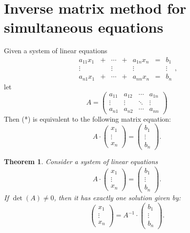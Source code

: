 \documentclass[
  12pt,
  oneside]{book}
\newtheorem{theorem}{Theorem}[chapter]
\theoremstyle{definition}
\theoremstyle{definition}
\theoremstyle{definition}
\theoremstyle{definition}
\theoremstyle{remark}
\begin{document}
\hypertarget{inverse-matrix-method-for-simultaneous-equations}{%
\section{Inverse matrix method for simultaneous equations}\label{inverse-matrix-method-for-simultaneous-equations}}

Given a system of linear equations
\begin{equation}
    \begin{matrix}
    a_{11}x_1 & + & \cdots & + & a_{1n}x_n & = &  b_1\\
    \vdots &   & \vdots &  & \vdots &  & \vdots\\
    a_{n1}x_1 & + & \cdots & + & a_{nn}x_n & = & b_n
\end{matrix},\tag{\(\ast\)}
\end{equation}
let
\[
A =
\begin{pmatrix}
    a_{11} & a_{12} & \cdots & a_{1n}\\
    \vdots & \vdots & \ddots & \vdots\\
    a_{n1} & a_{n2} & \cdots & a_{nn}
\end{pmatrix}
\]
Then (*) is equivalent to the following matrix equation:
\[
A\cdot
\begin{pmatrix}x_1\\\vdots\\ x_n\end{pmatrix}
=
\begin{pmatrix}b_1\\\vdots\\ b_n\end{pmatrix}.
\]

\begin{theorem}
Consider a system of linear equations
\[
  A\cdot
\begin{pmatrix}x_1\\\vdots\\ x_n\end{pmatrix}
=
\begin{pmatrix}b_1\\\vdots\\ b_n\end{pmatrix}.
\]
If \(\det(A)\not=0\), then it has exactly one solution given by:
\[
\begin{pmatrix}x_1\\\vdots\\ x_n\end{pmatrix}
=
A^{-1}\cdot
\begin{pmatrix}b_1\\\vdots\\ b_n\end{pmatrix}.
\]
\end{theorem}
\end{document}

